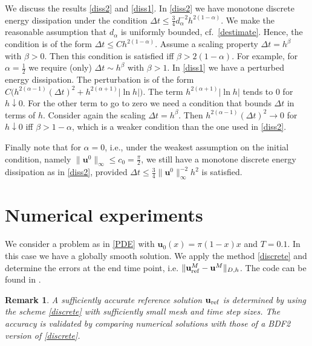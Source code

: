 \documentclass{siamltex}
\newcommand{\bu}{\mathbf u}
\newtheorem{remark}{Remark}[section]
\begin{document}
{We discuss the results \eqref{diss2} and \eqref{diss1}. In \eqref{diss2} we have  monotone discrete energy dissipation under the condition $\Delta t \leq \tfrac34 d_\alpha^{-2} h^{2(1-\alpha)}$. We make the reasonable assumption that $ d_\alpha$ is uniformly bounded, cf.~\eqref{destimate}. Hence, the condition is of the form $\Delta t \leq C h^{2(1-\alpha)}$. Assume a scaling property $\Delta t = h^{\beta}$ with $\beta >0$. Then this  condition is satisfied iff $\beta > 2(1-\alpha)$. For example, for $\alpha= \frac12$ we require (only) $\Delta t \sim h^\beta$ with $\beta >1$. In \eqref{diss1}  we have a perturbed energy dissipation. The perturbation is of the form $C\big(h^{2(\alpha-1)}(\Delta t)^2 +h^{2(\alpha +1)}|\ln h|\big)$. The term $h^{2(\alpha +1)}|\ln h|$ tends to $0$ for $h \downarrow 0$. For the other term to go to zero we need a condition that bounds $\Delta t$ in  terms of $h$. Consider again the scaling $\Delta t = h^{\beta}$. Then $h^{2(\alpha-1)}(\Delta t)^2 \to 0$ for $h \downarrow 0$ iff $\beta > 1 - \alpha$, which is a  weaker condition than the one used in \eqref{diss2}. 

Finally note that for $\alpha=0$, i.e., under the weakest assumption on the initial condition, namely $\|\bu^0\|_\infty \leq c_0=\frac{\pi}{2}$, we still have a monotone discrete energy dissipation as in \eqref{diss2}, provided $\Delta t \leq \tfrac34 \|\bu^0\|_\infty^{-2} h^2$ is satisfied. 





\section{Numerical experiments}\label{sec:NumericalExp}
We consider a problem as in \eqref{PDE} with $\bu_0(x) = \pi(1-x)x$ and $T=0.1$.  In this case we have a globally smooth solution. We apply the method \eqref{discrete} and determine the errors at the end time point, i.e. $\|\bu_{\rm ref}^M-\bu^M\|_{D,h}$. The code can be found in \cite{nguyen_2025_15481333}.
\begin{remark} \rm
A sufficiently accurate reference solution $\bu_{\rm ref}$ is determined by using the scheme \eqref{discrete} with sufficiently small mesh and time step sizes. The accuracy is validated by comparing numerical solutions with those of a BDF2 version of \eqref{discrete}.
\end{remark}

}
\end{document}
